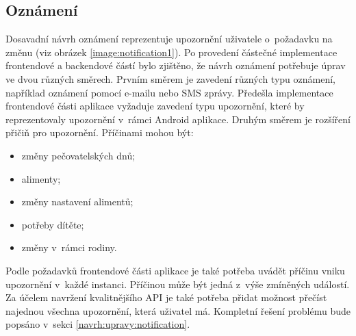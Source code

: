      \subsection{Oznámení}
        Dosavadní návrh oznámení reprezentuje upozornění uživatele o~požadavku na změnu (viz obrázek \ref{image:notification1}). Po provedení částečné implementace frontendové a backendové částí bylo zjištěno, že návrh oznámení potřebuje úprav ve dvou různých směrech. Prvním směrem je zavedení různých typu oznámení, například oznámení pomocí e-mailu nebo SMS zprávy. Předešla implementace frontendové části aplikace vyžaduje zavedení typu upozornění, které by reprezentovaly upozornění v~rámci Android aplikace. 
        Druhým směrem je rozšíření přičiň pro upozornění. Příčinami mohou být:
        \begin{itemize}
            \setlength\itemsep{0.3em}
            \item změny pečovatelských dnů;
            \item alimenty;
            \item změny nastavení alimentů;
            \item potřeby dítěte;
            \item změny v~rámci rodiny.
        \end{itemize}
        Podle požadavků frontendové části aplikace je také potřeba uvádět příčinu vniku upozornění v~každé instanci. Příčinou může být jedná z~výše zmíněných událostí. Za účelem navržení kvalitnějšího API je také potřeba přidat možnost přečíst najednou všechna upozornění, která uživatel má. Kompletní řešení problému bude popsáno v~sekci \ref{navrh:upravy:notification}.
        
            
            
